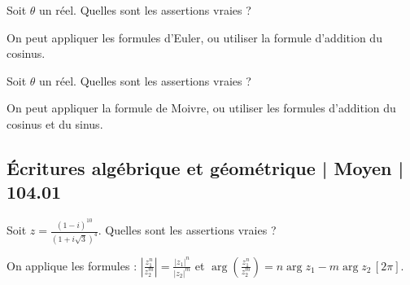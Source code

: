 \begin{question}

Soit $\theta$ un réel.  Quelles sont les assertions vraies ?
\begin{answers}


\end{answers}
\begin{explanations}
On peut appliquer les formules d'Euler, ou utiliser la formule d'addition du cosinus. 

\end{explanations}

\end{question}


\begin{question}
 
Soit $\theta$ un réel.  Quelles sont les assertions vraies ?
\begin{answers}
    \bad{$\cos(2\theta)= 2\cos\theta \sin \theta$}
    \good{ $\cos(2\theta)= \cos^2\theta -\sin^2 \theta$}

    \good{$\sin(2\theta)= 2\cos\theta \sin \theta$}

    \bad{$\sin(2\theta)= \cos^2\theta -\sin^2 \theta$}
\end{answers}
\begin{explanations}
On peut appliquer la formule de Moivre, ou utiliser les formules d'addition du cosinus et du sinus. 

\end{explanations}

\end{question}

\subsection{Écritures algébrique et géométrique | Moyen | 104.01}

\begin{question}
 
Soit $z=\frac{(1-i)^{10}}{(1+i\sqrt 3)^4}$. Quelles sont les assertions vraies ?
\begin{answers}
    



 
\end{answers}
\begin{explanations}
On applique les formules :
$|\frac{z_1^n}{z_2^m}|= \frac{|z_1|^n}{|z_2|^m}$   et $\arg(\frac{z_1^n}{z_2^m})= n\arg z_1 - m\arg z_2 \, [2\pi]$. 
\end{explanations}

\end{question}







